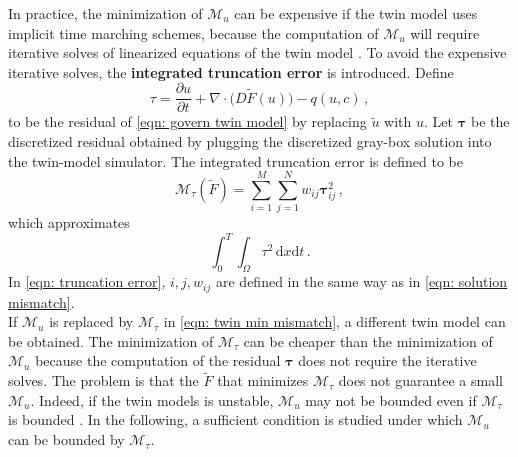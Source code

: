 In practice, the minimization of $\mathcal{M}_u$ can be expensive if the twin model uses
implicit time marching schemes, because the computation of $\mathcal{M}_u$ will require iterative
solves of linearized equations of the twin model \cite{PDE theory}.
To avoid the expensive iterative solves, the \textbf{integrated truncation error} is introduced.
Define
\begin{equation}
    \tau = \frac{\partial u}{\partial t} 
    + \nabla \cdot \big(D \tilde{F}(u)\big) - q(u,c)\,,
    \label{eqn: residual}
\end{equation}
to be the residual of \eqref{eqn: govern twin model}
by replacing $\tilde{u}$ with $u$.
Let $\boldsymbol{\tau}$ be the discretized residual obtained by plugging the discretized 
gray-box solution into the twin-model simulator.
The integrated truncation error is defined to be
\begin{equation}
    \mathcal{M}_{\tau}(\tilde{F}) = \sum_{i=1}^M \sum_{j=1}^N w_{ij} \boldsymbol{\tau}_{ij}^2 \,,
    \label{eqn: truncation error}
\end{equation}
which approximates
\begin{equation}
    \int_0^T \int_\Omega \tau^2 \, \textrm{d}x\textrm{d}t\,.
    \label{eqn: integrated residual}
\end{equation}
In \eqref{eqn: truncation error}, 
$i, j, w_{ij}$ are defined in the same way as in \eqref{eqn: solution mismatch}.\\

If $\mathcal{M}_u$ is replaced by $\mathcal{M}_{\tau}$ in \eqref{eqn: twin min mismatch},
a different twin model can be obtained. The minimization of $\mathcal{M}_{\tau}$ can be
cheaper than the minimization of $\mathcal{M}_u$ because the computation of the residual 
$\boldsymbol{\tau}$ does not require the iterative solves.
The problem is that the $\tilde{F}$ that minimizes 
$\mathcal{M}_{\tau}$ does not guarantee a small $\mathcal{M}_u$.
Indeed, if the twin models is unstable, $\mathcal{M}_u$ may not be bounded even if 
$\mathcal{M}_{\tau}$ is bounded \cite{PDE theory}.
In the following, a sufficient condition is studied under which $\mathcal{M}_u$ can be bounded by 
$\mathcal{M}_{\tau}$.\\

